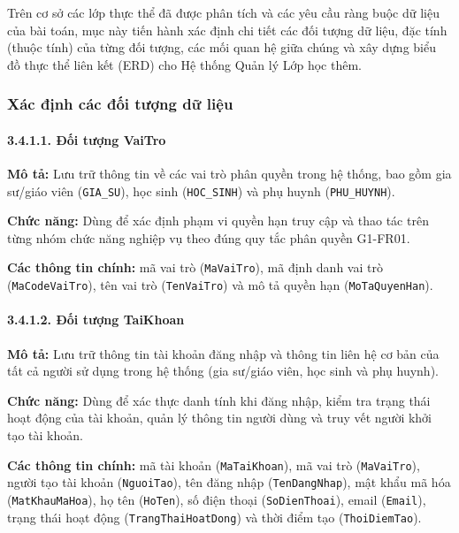 \documentclass[12pt,a4paper]{article}
\begin{document}
Trên cơ sở các lớp thực thể đã được phân tích và các yêu cầu ràng buộc dữ liệu của bài toán, mục này tiến hành xác định chi tiết các đối tượng dữ liệu, đặc tính (thuộc tính) của từng đối tượng, các mối quan hệ giữa chúng và xây dựng biểu đồ thực thể liên kết (ERD) cho Hệ thống Quản lý Lớp học thêm.

\subsubsection{Xác định các đối tượng dữ liệu}

\paragraph{3.4.1.1. Đối tượng VaiTro}\mbox{}\par
\textbf{Mô tả:} Lưu trữ thông tin về các vai trò phân quyền trong hệ thống, bao gồm gia sư/giáo viên (\texttt{GIA\_SU}), học sinh (\texttt{HOC\_SINH}) và phụ huynh (\texttt{PHU\_HUYNH}).\par
\textbf{Chức năng:} Dùng để xác định phạm vi quyền hạn truy cập và thao tác trên từng nhóm chức năng nghiệp vụ theo đúng quy tắc phân quyền G1-FR01.\par
\textbf{Các thông tin chính:} mã vai trò (\texttt{MaVaiTro}), mã định danh vai trò (\texttt{MaCodeVaiTro}), tên vai trò (\texttt{TenVaiTro}) và mô tả quyền hạn (\texttt{MoTaQuyenHan}).

\paragraph{3.4.1.2. Đối tượng TaiKhoan}\mbox{}\par
\textbf{Mô tả:} Lưu trữ thông tin tài khoản đăng nhập và thông tin liên hệ cơ bản của tất cả người sử dụng trong hệ thống (gia sư/giáo viên, học sinh và phụ huynh).\par
\textbf{Chức năng:} Dùng để xác thực danh tính khi đăng nhập, kiểm tra trạng thái hoạt động của tài khoản, quản lý thông tin người dùng và truy vết người khởi tạo tài khoản.\par
\textbf{Các thông tin chính:} mã tài khoản (\texttt{MaTaiKhoan}), mã vai trò (\texttt{MaVaiTro}), người tạo tài khoản (\texttt{NguoiTao}), tên đăng nhập (\texttt{TenDangNhap}), mật khẩu mã hóa (\texttt{MatKhauMaHoa}), họ tên (\texttt{HoTen}), số điện thoại (\texttt{SoDienThoai}), email (\texttt{Email}), trạng thái hoạt động (\texttt{TrangThaiHoatDong}) và thời điểm tạo (\texttt{ThoiDiemTao}).
\end{document}

